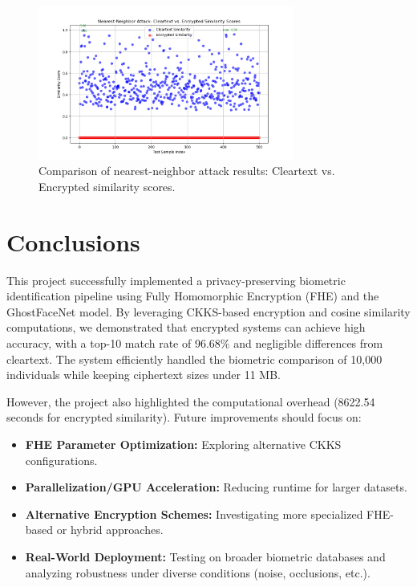 \documentclass[12pt,a4paper]{article}
\begin{document}
\begin{figure}[H]
    \centering
    \includegraphics[width=0.75\textwidth]{./elements/nearest_neighbor_attack_with_high_scores.png}
    \caption{Comparison of nearest-neighbor attack results: Cleartext vs. Encrypted similarity scores.}
    \label{fig:nn_attack}
\end{figure}

\section{Conclusions}
This project successfully implemented a privacy-preserving biometric identification pipeline using 
Fully Homomorphic Encryption (FHE) and the GhostFaceNet model. By leveraging CKKS-based encryption 
and cosine similarity computations, we demonstrated that encrypted systems can achieve high accuracy, 
with a top-10 match rate of 96.68\% and negligible differences from cleartext. The system efficiently 
handled the biometric comparison of 10,000 individuals while keeping ciphertext sizes under 11 MB. 

However, the project also highlighted the computational overhead (8622.54 seconds for encrypted 
similarity). Future improvements should focus on:
\begin{itemize}
    \item \textbf{FHE Parameter Optimization:} Exploring alternative CKKS configurations.
    \item \textbf{Parallelization/GPU Acceleration:} Reducing runtime for larger datasets.
    \item \textbf{Alternative Encryption Schemes:} Investigating more specialized FHE-based or 
    hybrid approaches.
    \item \textbf{Real-World Deployment:} Testing on broader biometric databases and analyzing 
    robustness under diverse conditions (noise, occlusions, etc.).
\end{itemize}
\end{document}
